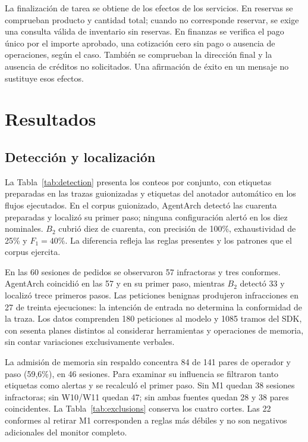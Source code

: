 \documentclass[conference]{IEEEtran}
\begin{document}
La finalización de tarea se obtiene de los efectos de los servicios. En reservas se comprueban producto y cantidad total; cuando no corresponde reservar, se exige una consulta válida de inventario sin reservas. En finanzas se verifica el pago único por el importe aprobado, una cotización cero sin pago o ausencia de operaciones, según el caso. También se comprueban la dirección final y la ausencia de créditos no solicitados. Una afirmación de éxito en un mensaje no sustituye esos efectos.

\section{Resultados}
\subsection{Detección y localización}
La Tabla~\ref{tab:detection} presenta los conteos por conjunto, con etiquetas preparadas en las trazas guionizadas y etiquetas del anotador automático en los flujos ejecutados. En el corpus guionizado, AgentArch detectó las cuarenta preparadas y localizó su primer paso; ninguna configuración alertó en los diez nominales. \(B_2\) cubrió diez de cuarenta, con precisión de 100\%, exhaustividad de 25\% y \(F_1=40\%\). La diferencia refleja las reglas presentes y los patrones que el corpus ejercita.


En las 60 sesiones de pedidos se observaron 57 infractoras y tres conformes. AgentArch coincidió en las 57 y en su primer paso, mientras \(B_2\) detectó 33 y localizó trece primeros pasos. Las peticiones benignas produjeron infracciones en 27 de treinta ejecuciones: la intención de entrada no determina la conformidad de la traza. Los datos comprenden 180 peticiones al modelo y 1085 tramos del SDK, con sesenta planes distintos al considerar herramientas y operaciones de memoria, sin contar variaciones exclusivamente verbales.

La admisión de memoria sin respaldo concentra 84 de 141 pares de operador y paso (59,6\%), en 46 sesiones. Para examinar su influencia se filtraron tanto etiquetas como alertas y se recalculó el primer paso. Sin M1 quedan 38 sesiones infractoras; sin W10/W11 quedan 47; sin ambas fuentes quedan 28 y 38 pares coincidentes. La Tabla~\ref{tab:exclusions} conserva los cuatro cortes. Las 22 conformes al retirar M1 corresponden a reglas más débiles y no son negativos adicionales del monitor completo.

\end{document}
